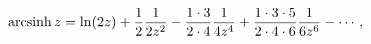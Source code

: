 \[\mathop{\mathrm{arcsinh}\/}\nolimits z=\mathop{\ln\/}\nolimits\!\left(2z\right%
)+\frac{1}{2}\frac{1}{2z^{2}}-\frac{1\cdot 3}{2\cdot 4}\frac{1}{4z^{4}}+\frac{%
1\cdot 3\cdot 5}{2\cdot 4\cdot 6}\frac{1}{6z^{6}}-\cdots,\]
